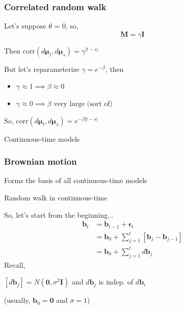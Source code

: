 \documentclass[36pt,handout]{beamer}
\newcommand{\ft}[1]{\frametitle{#1}}
\newcommand{\bb}{\mathbf{b}}
\newcommand{\bmu}{\boldsymbol{\mu}}
\newcommand{\be}{\boldsymbol{\epsilon}}
\begin{document}

\begin{frame}
\ft{Correlated random walk}
Let's suppose $\theta$ = 0, so,
$$\mathbf{M} = \gamma \mathbf{I}$$
\medskip

Then $\mbox{corr}(d\bmu_t, d\bmu_s) = \gamma^{|t-s|}$
\bigskip

But let's reparameterize $\gamma = e^{-\beta}$, then 
\begin{itemize}
\item $\gamma \approx 1 \implies \beta \approx 0$ 
\item $\gamma \approx 0 \implies \beta \mbox{ very large (sort of)}$ 
\end{itemize}

So, $\mbox{corr}(d\bmu_t, d\bmu_s) = e^{-\beta|t-s|}$

\end{frame}

{
\begin{frame}
\textcolor{noaaturq}{\Huge Continuous-time models}
\end{frame}
}


\begin{frame}
\ft{Brownian motion}
Forms the basis of all continuous-time models\medskip

Random walk in continuous-time \medskip

So, let's start from the beginning...
$$
\begin{aligned}
\bb_t &= \bb_{t-1} + \be_t \\
&= \bb_0 + \sum_{j=1}^{t}\left[\bb_j-\bb_{j-1}\right] \\
&= \bb_0 + \sum_{j=1}^{t} d\bb_j
\end{aligned}
$$
Recall,

$[d\bb_j] = N(\mathbf{0},\sigma^2\mathbf{I})$ and $d\bb_j$ is indep. of $d\bb_i$

(usually, $\bb_0 = \mathbf{0}$ and $\sigma=1$)

\end{frame}

\end{document}
